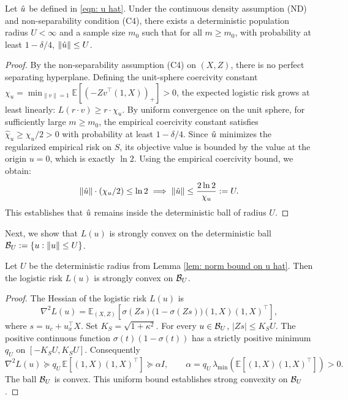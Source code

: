 \begin{lem}\label{lem: norm bound on u hat}
    Let $\hat{u}$ be defined in \eqref{eqn: u hat}. Under the continuous density assumption (ND) and non-separability condition (C4), there exists a deterministic population radius $U < \infty$ and a sample size $m_0$ such that for all $m \ge m_0$, with probability at least $1-\delta/4$,
    $\lVert \hat{u} \rVert \leq U$.
\end{lem}

\begin{proof}
    By the non-separability assumption (C4) on $(X,Z)$, there is no perfect separating hyperplane. Defining the unit-sphere coercivity constant $\chi_{u} = \min_{\lVert v \rVert=1} \mathbb{E}[(-Z v^\top (1, X))_+] > 0$, the expected logistic risk grows at least linearly: $L(r \cdot v) \ge r \cdot \chi_{u}$.
    By uniform convergence on the unit sphere, for sufficiently large $m \ge m_0$, the empirical coercivity constant satisfies $\hat{\chi}_u \ge \chi_{u} / 2 > 0$ with probability at least $1-\delta/4$.
    Since $\hat{u}$ minimizes the regularized empirical risk on $S$, its objective value is bounded by the value at the origin $u=0$, which is exactly $\ln 2$. Using the empirical coercivity bound, we obtain:
    \begin{equation*}
        \lVert \hat{u} \rVert \cdot (\chi_u / 2) \le \ln 2 \implies \lVert \hat{u} \rVert \le \frac{2 \ln 2}{\chi_u} := U.
    \end{equation*}
    This establishes that $\hat{u}$ remains inside the deterministic ball of radius $U$.
\end{proof}

Next, we show that $L(u)$ is strongly convex on the deterministic ball $\mathcal{B}_U := \{u: \lVert u \rVert \le U\}$.
\begin{lem}\label{lem: Strongly convex} Let $U$ be the deterministic radius from Lemma \ref{lem: norm bound on u hat}. Then the logistic risk $L(u)$ is strongly convex on $\mathcal{B}_U$.
\end{lem}

\begin{proof}
The Hessian of the logistic risk $L(u)$ is
\begin{equation*}
    \nabla^2 L(u) = \mathbb{E}_{(X,Z)}[ \sigma(Zs)\big(1 - \sigma(Zs)\big) (1, X)(1, X)^\top ],
\end{equation*}
where  $s = u_c + u_x^\top X$.
Set $K_S=\sqrt{1+\kappa^2}$.
For every $u\in\mathcal{B}_U$, $|Zs|\leq K_S U$.
The positive continuous function $\sigma(t)(1-\sigma(t))$ has a
strictly positive minimum $q_U$ on $[-K_S U, K_S U]$. Consequently
\[
\nabla^2L(u)\succeq q_U\,\mathbb E[(1,X)(1,X)^\top]\succeq\alpha I,
\qquad
\alpha=q_U\,\lambda_{\min}\!\left(\mathbb E[(1,X)(1,X)^\top]\right)>0.
\]
The ball $\mathcal{B}_U$ is convex.
This uniform bound establishes strong convexity on $\mathcal{B}_U$.
\end{proof}

